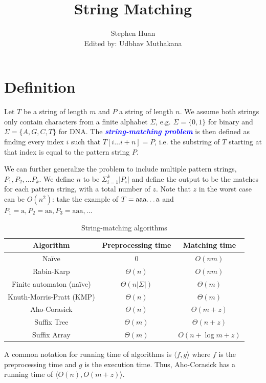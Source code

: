 \documentclass[11pt, oneside]{article}
\title{String Matching}
\author{Stephen Huan \\ Edited by: Udbhav Muthakana}
\newcommand{\emphasis}[1]{\textcolor{blue}{\textbf{\textit{#1}}}}
\begin{document}
\maketitle

\section{Definition}
Let \( T \) be a string of length \( m \) and \( P \) a string of length \( n \).
We assume both strings only contain characters from a finite alphabet \( \Sigma \),
e.g. \( \Sigma = \{ 0, 1 \} \) for binary and \( \Sigma = \{ A, G, C, T \} \) for DNA.
The \emphasis{string-matching problem} is then defined as finding every index \( i \)
such that \( T[i \dots i + n] = P \), i.e. the substring of \( T \) starting at that index is
equal to the pattern string \( P \).

We can further generalize the problem to include multiple pattern strings, \( P_1, P_2, \dots P_k \). We define \( n \) to be \( \Sigma^{k}_{i = 1} |P_i| \) and define the output to be the matches for each pattern string, with a total number of \( z \). Note that \( z \) in the worst case can be
\( O(n^2) \): take the example of \( T = \text{aaa\dots a} \) and \( P_1 = \text{a}, P_2 = \text{aa}, P_3 = \text{aaa}, \dots \)

\begin{table}[h!]
\centering
\begin{tabular}{ ccc }
 Algorithm & Preprocessing time & Matching time \\
 \hline
 Naïve & \( 0 \) & \( O(nm) \) \\
 Rabin-Karp & \( \Theta(n) \) & \( O(nm) \) \\
 Finite automaton (naïve) & \( \Theta(n|\Sigma|) \) & \( \Theta(m) \) \\
 Knuth-Morris-Pratt (KMP) & \( \Theta(n) \) & \( \Theta(m) \) \\
 Aho-Corasick & \( \Theta(n) \) & \( \Theta(m + z) \) \\
 Suffix Tree & \( \Theta(m) \) & \( \Theta(n + z) \) \\
 Suffix Array & \( \Theta(m) \) & \( O(n + \log m + z) \) \\
 \hline
\end{tabular}
\caption{String-matching algorithms}
\end{table}

A common notation for running time of algorithms is \( \langle f, g \rangle \)
where \( f \) is the preprocessing time and \( g \) is the execution time. Thus, Aho-Corasick has a running time of \( \langle O(n), O(m + z) \rangle \).
\end{document}
